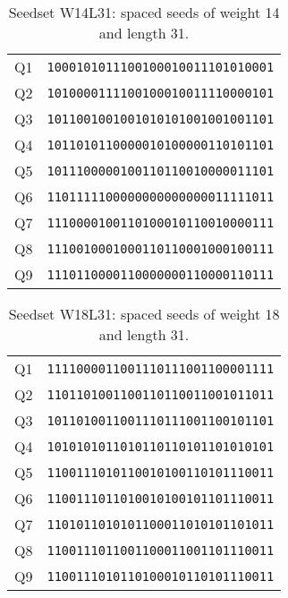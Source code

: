 \begin{table}[!ht]
	\centering
	\begin{tabular}{l r}
		Q1 & \verb|1000101011100100010011101010001| \\
		Q2 & \verb|1010000111100100010011110000101| \\
		Q3 & \verb|1011001001001010101001001001101| \\
		Q4 & \verb|1011010110000010100000110101101| \\
		Q5 & \verb|1011100000100110110010000011101| \\
		Q6 & \verb|1101111100000000000000011111011| \\
		Q7 & \verb|1110000100110100010110010000111| \\
		Q8 & \verb|1110010001000110110001000100111| \\
		Q9 & \verb|1110110000110000000110000110111| \\
		\bottomrule
	\end{tabular}
	\caption{Seedset W14L31: spaced seeds of weight 14 and length 31.}
	\label{tab:seedset-W14L31}
\end{table}


\begin{table}[!ht]
	\centering
	\begin{tabular}{l r}
		Q1 & \verb|1111000011001110111001100001111| \\
		Q2 & \verb|1101101001100110110011001011011| \\
		Q3 & \verb|1011010011001110111001100101101| \\
		Q4 & \verb|1010101011010110110101101010101| \\
		Q5 & \verb|1100111010110010100110101110011| \\
		Q6 & \verb|1100111011010010100101101110011| \\
		Q7 & \verb|1101011010101100011010101101011| \\
		Q8 & \verb|1100111011001100011001101110011| \\
		Q9 & \verb|1100111010110100010110101110011| \\
		\bottomrule
	\end{tabular}
	\caption{Seedset W18L31: spaced seeds of weight 18 and length 31.}
	\label{tab:seedset-W18L31}
\end{table}
\clearpage


